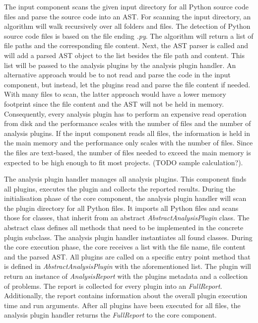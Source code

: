 The input component scans the given input directory for all Python source code files and parse the source code into an AST. 
For scanning the input directory, an algorithm will walk recursively over all folders and files. The detection of Python source code files is based on the file ending \textit{.py}. The algorithm will return a list of file paths and the corresponding file content. 
Next, the AST parser is called and will add a parsed AST object to the list besides the file path and content. This list will be passed to the analysis plugins by the analysis plugin handler.  An alternative approach would be to not read and parse the code in the input component, but instead, let the plugins read and parse the file content if needed. With many files to scan, the latter approach would have a lower memory footprint since the file content and the AST will not be held in memory. Consequently, every analysis plugin has to perform an expensive read operation from disk and the performance scales with the number of files and the number of analysis plugins. 
If the input component reads all files, the information is held in the main memory and the performance only scales with the number of files. Since the files are text-based, the number of files needed to exceed the main memory is expected to be high enough to fit most projects. (TODO sample calculation?).

The analysis plugin handler manages all analysis plugins. This component finds all plugins, executes the plugin and collects the reported results.
During the initialisation phase of the core component, the analysis plugin handler will scan the plugin directory for all Python files. It imports all Python files and scans those for classes, that inherit from an abstract \textit{AbstractAnalysisPlugin} class. The abstract class defines all methods that need to be implemented in the concrete plugin subclass. The analysis plugin handler instantiates all found classes.
During the core execution phase, the core receives a list with the file name, file content and the parsed AST. All plugins are called on a specific entry point method that is defined in \textit{AbstractAnalysisPlugin} with the aforementioned list. The plugin will return an instance of \textit{AnalysisReport} with the plugins metadata and a collection of problems. The report is collected for every plugin into an \textit{FullReport}. Additionally, the report contains information about the overall plugin execution time and run arguments. After all plugins have been executed for all files, the analysis plugin handler returns the \textit{FullReport} to the core component.


